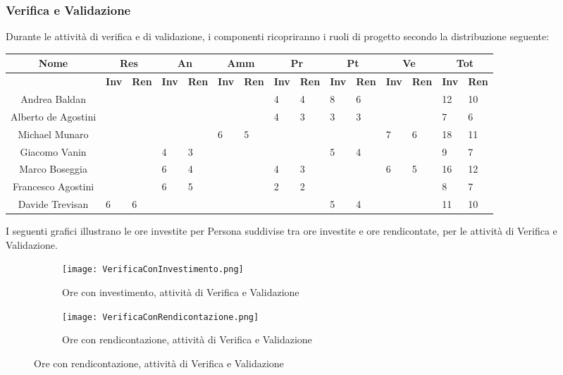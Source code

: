 \documentclass{scalatekids-article}
\begin{document}
\subsubsection{Verifica e Validazione}
Durante le attività di verifica e di validazione, i componenti ricopriranno i ruoli di progetto secondo la distribuzione seguente:
\begin{center}
  \scriptsize
  \begin{tabular}{| c | p{0.35cm}  p{0.35cm} | p{0.35cm}  p{0.35cm} | p{0.35cm}  p{0.35cm} | p{0.35cm}  p{0.35cm} | p{0.35cm}  p{0.35cm} | p{0.35cm}  p{0.35cm} | p{0.35cm}  p{0.35cm} |}
    \hline
    \textbf{Nome} & \multicolumn{2}{|c|}{\textbf{Res}} & \multicolumn{2}{|c|}{\textbf{An}} & \multicolumn{2}{|c|}{\textbf{Amm}} & \multicolumn{2}{|c|}{\textbf{Pr}} & \multicolumn{2}{|c|}{\textbf{Pt}} & \multicolumn{2}{|c|}{\textbf{Ve}} & \multicolumn{2}{|c|}{\textbf{Tot}}\\

    \hline
    & \textbf{Inv} & \textbf{Ren} & \textbf{Inv} & \textbf{Ren} & \textbf{Inv} & \textbf{Ren} & \textbf{Inv} & \textbf{Ren} & \textbf{Inv} & \textbf{Ren} & \textbf{Inv} & \textbf{Ren} & \textbf{Inv} & \textbf{Ren}\\
    \hline
    Andrea Baldan & & & & & & & 4 & 4 & 8 & 6 & & & 12 & 10\\
    Alberto de Agostini & & & & & & & 4 & 3 & 3 & 3 & & & 7 & 6\\
    Michael Munaro & & & & & 6 & 5 & & & & & 7 & 6 & 18 & 11\\
    Giacomo Vanin & & & 4 & 3 & & & & & 5 & 4 & & & 9 & 7\\
    Marco Boseggia & & & 6 & 4 & & & 4 & 3 & & & 6 & 5 & 16 & 12\\
    Francesco Agostini & & & 6 & 5 & & & 2 & 2 & & & & & 8 & 7\\
    Davide Trevisan & 6 & 6 & & & & & & & 5 & 4 & & & 11 & 10\\
    \hline
  \end{tabular}
\end{center}
\normalsize I seguenti grafici illustrano le ore investite per Persona suddivise
tra ore investite e ore rendicontate, per le attività di Verifica e Validazione.
\begin{figure}[H]
  \begin{subfigure}[H]{0.47\textwidth}
    \texttt{[image: VerificaConInvestimento.png]}
    \caption{Ore con investimento, attività di Verifica e Validazione}
  \end{subfigure}
  \qquad
  \begin{subfigure}[H]{0.47\textwidth}
    \texttt{[image: VerificaConRendicontazione.png]}
    \caption{Ore con rendicontazione, attività di Verifica e Validazione}
  \end{subfigure}
\end{figure}
\end{document}
